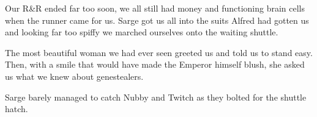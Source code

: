 Our R\&R ended far too soon, we all still had money and functioning brain cells when the runner came for us. 
Sarge got us all into the suits Alfred had gotten us and looking far too spiffy we marched ourselves onto the waiting shuttle.

The most beautiful woman we had ever seen greeted us and told us to stand easy. 
Then, with a smile that would have made the Emperor himself blush, she asked us what we knew about genestealers. 

Sarge barely managed to catch Nubby and Twitch as they bolted for the shuttle hatch.



